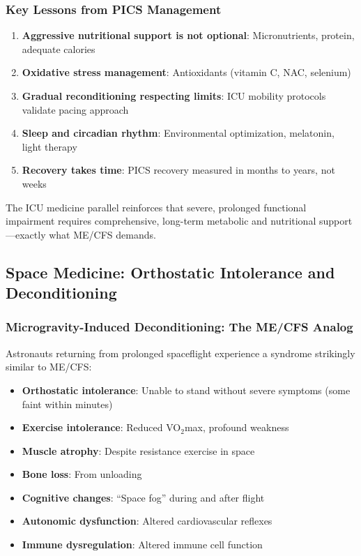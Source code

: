 \subsubsection{Key Lessons from PICS Management}

\begin{enumerate}
    \item \textbf{Aggressive nutritional support is not optional}: Micronutrients, protein, adequate calories
    \item \textbf{Oxidative stress management}: Antioxidants (vitamin C, NAC, selenium)
    \item \textbf{Gradual reconditioning respecting limits}: ICU mobility protocols validate pacing approach
    \item \textbf{Sleep and circadian rhythm}: Environmental optimization, melatonin, light therapy
    \item \textbf{Recovery takes time}: PICS recovery measured in months to years, not weeks
\end{enumerate}

The ICU medicine parallel reinforces that severe, prolonged functional impairment requires comprehensive, long-term metabolic and nutritional support—exactly what ME/CFS demands.

\subsection{Space Medicine: Orthostatic Intolerance and Deconditioning}
\label{subsec:space-medicine-parallel}

\subsubsection{Microgravity-Induced Deconditioning: The ME/CFS Analog}

Astronauts returning from prolonged spaceflight experience a syndrome strikingly similar to ME/CFS:

\begin{itemize}
    \item \textbf{Orthostatic intolerance}: Unable to stand without severe symptoms (some faint within minutes)
    \item \textbf{Exercise intolerance}: Reduced VO$_2$max, profound weakness
    \item \textbf{Muscle atrophy}: Despite resistance exercise in space
    \item \textbf{Bone loss}: From unloading
    \item \textbf{Cognitive changes}: ``Space fog'' during and after flight
    \item \textbf{Autonomic dysfunction}: Altered cardiovascular reflexes
    \item \textbf{Immune dysregulation}: Altered immune cell function
\end{itemize}

